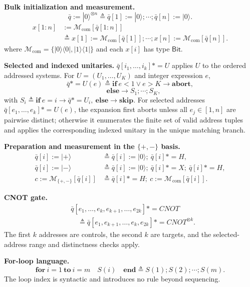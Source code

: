 \documentclass[conference,compsoc]{IEEEtran}
\providecommand{\ket}[1]{\lvert #1\rangle}
\newcommand{\asteq}{\mathrel{*\!=}}
\begin{document}
\smallskip
\noindent\textbf{Bulk initialization and measurement.}
\[
\bar q:=|0\rangle^{\otimes n}
\triangleq
\bar q[1]:=|0\rangle;\cdots;\bar q[n]:=|0\rangle .
\]
\[
\begin{aligned}
x[1{:}n]&:=\mathcal M_{\mathrm{com}}[\bar q[1{:}n]]\\
&\triangleq
x[1]:=\mathcal M_{\mathrm{com}}[\bar q[1]];\cdots;
x[n]:=\mathcal M_{\mathrm{com}}[\bar q[n]] .
\end{aligned}
\]
where
\(\mathcal M_{\mathrm{com}}=\{|0\rangle\langle0|,|1\rangle\langle1|\}\)
and each \(x[i]\) has type \(\mathsf{Bit}\).

\smallskip
\noindent\textbf{Selected and indexed unitaries.}
\(\bar q[i_1,\ldots,i_k]\asteq U\) applies \(U\) to the ordered addressed
systems. For \(U=(U_1,\ldots,U_K)\) and integer expression \(e\),
\[
\bar q\asteq U(e)
\triangleq
\mathbf{if}\ e<1\lor e>K\to\mathbf{abort},\]\[
\quad
\mathbf{else}\to S_1;\cdots;S_K,
\]
with \(S_i\triangleq\mathbf{if}\ e=i\to\bar q\asteq U_i,\ 
\mathbf{else}\to\mathbf{skip}\). For selected addresses
\(\bar q[e_1,\ldots,e_k]\asteq U(e)\), the expansion first aborts unless
all \(e_j\in[1,n]\) are pairwise distinct; otherwise it enumerates the finite
set of valid address tuples and applies the corresponding indexed unitary in
the unique matching branch.

\smallskip
\noindent\textbf{Preparation and measurement in the \(\{+,-\}\) basis.}
\begin{align*}
\bar q[i]:=\ket+ &\triangleq \bar q[i]:=\ket0;\ \bar q[i]\asteq H,\\
\bar q[i]:=\ket- &\triangleq \bar q[i]:=\ket0;\ \bar q[i]\asteq X;\ \bar q[i]\asteq H,\\
c:=\mathcal M_{\{+,-\}}[\bar q[i]]
&\triangleq \bar q[i]\asteq H;\ c:=\mathcal M_{\mathrm{com}}[\bar q[i]] .
\end{align*}

\smallskip
\noindent\textbf{CNOT gate.}
\[
\begin{aligned}
&\bar q[e_1,\ldots,e_k,e_{k+1},\ldots,e_{2k}]\asteq CNOT\\
&\quad\triangleq
\bar q[e_1,e_{k+1},\ldots,e_k,e_{2k}]
\asteq CNOT^{\otimes k}.
\end{aligned}
\]
The first \(k\) addresses are controls, the second \(k\) are targets, and the
selected-address range and distinctness checks apply.

\smallskip
\noindent\textbf{For-loop language.}
\[
\mathbf{for}\ i=1\ \mathbf{to}\ i=m\quad S(i)\quad\mathbf{end}
\triangleq
S(1);S(2);\cdots;S(m).
\]
The loop index is syntactic and introduces no rule beyond sequencing.
\end{document}
